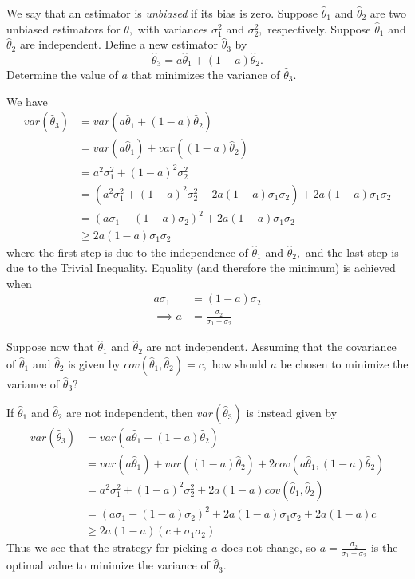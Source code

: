 \documentclass{article}
\begin{document}
\begin{enumerate}
\begin{enumerate}
			\ii We say that an estimator is \textit{unbiased} if its bias is zero. Suppose $\hat{\theta}_1$ and $\hat{\theta}_2$ are two unbiased estimators for $\theta,$ with variances $\sigma_1^2$ and $\sigma_2^2,$ respectively. Suppose $\hat{\theta}_1$ and $\hat{\theta}_2$ are independent. Define a new estimator $\hat{\theta}_3$ by \[\hat{\theta}_3=a\hat{\theta}_1+(1-a)\hat{\theta}_2. \] Determine the value of $a$ that minimizes the variance of $\hat{\theta}_3.$
				\begin{soln}
					We have 
					\begin{align*}
						var(\hat{\theta}_3) &= var(a\hat{\theta}_1+(1-a)\hat{\theta}_2) \\
						&= var(a\hat{\theta}_1)+var( (1-a) \hat{\theta}_2) \\
						&= a^2\sigma_1^2 + (1-a)^2\sigma_2^2 \\
						&= (a^2\sigma_1^2+(1-a)^2\sigma_2^2-2a(1-a)\sigma_1\sigma_2) + 2a(1-a)\sigma_1\sigma_2 \\
						&= (a\sigma_1-(1-a)\sigma_2)^2+2a(1-a)\sigma_1\sigma_2 \\
						&\ge 2a(1-a)\sigma_1\sigma_2
					\end{align*} where the first step is due to the independence of $\hat{\theta}_1$ and $\hat{\theta}_2,$ and the last step is due to the Trivial Inequality. Equality (and therefore the minimum) is achieved when
					\begin{align*}
						a\sigma_1 &=(1-a)\sigma_2 \\
						\implies a &= \boxed{\frac{\sigma_2}{\sigma_1+\sigma_2}}
					\end{align*}
				\end{soln}

			\ii Suppose now that $\hat{\theta}_1$ and $\hat{\theta}_2$ are not independent. Assuming that the covariance of $\hat{\theta}_1$ and $\hat{\theta}_2$ is given by $cov(\hat{\theta}_1, \hat{\theta}_2)=c,$ how should $a$ be chosen to minimize the variance of $\hat{\theta}_3?$
				\begin{soln}
					If $\hat{\theta}_1$ and $\hat{\theta}_2$ are not independent, then $var(\hat{\theta}_3)$ is instead given by 
					\begin{align*}
						var(\hat{\theta}_3) &= var(a\hat{\theta}_1+(1-a)\hat{\theta}_2) \\
						&= var(a\hat{\theta}_1)+var( (1-a) \hat{\theta}_2) + 2cov(a\hat{\theta}_1, (1-a)\hat{\theta}_2) \\
						&= a^2\sigma_1^2+(1-a)^2\sigma_2^2+2a(1-a)cov(\hat{\theta}_1, \hat{\theta}_2) \\
						&= (a\sigma_1-(1-a)\sigma_2)^2+2a(1-a)\sigma_1\sigma_2+2a(1-a)c \\
						&\ge 2a(1-a)(c+\sigma_1\sigma_2)
					\end{align*} Thus we see that the strategy for picking $a$ does not change, so $a=\boxed{\frac{\sigma_2}{\sigma_1+\sigma_2}}$ is the optimal value to minimize the variance of $\hat{\theta}_3.$
				\end{soln}
	\end{enumerate}	


\end{enumerate}
\end{document}
